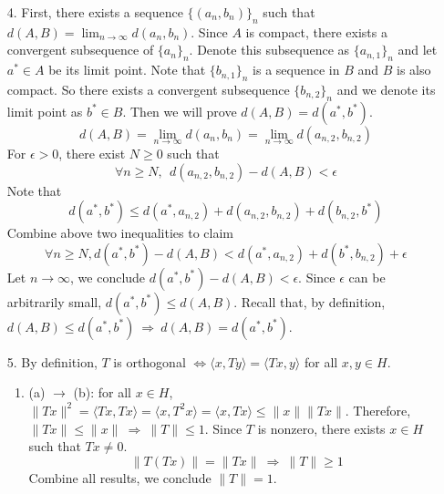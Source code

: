 \begin{itemize}
	\item[4.] First, there exists a sequence $\{(a_n, b_n)\}_n$ such that $d(A,B) = \lim_{n\rightarrow\infty}d(a_n,b_n)$. Since $A$ is compact, there exists a convergent subsequence of $\{a_n\}_n$. Denote this subsequence as $\{a_{n,1}\}_n$ and let $a^*\in A$ be its limit point. Note that $\{b_{n,1}\}_n$ is a sequence in $B$ and $B$ is also compact. So there exists a convergent subsequence $\{b_{n,2}\}_n$ and we denote its limit point as $b^*\in B$. Then we will prove $d(A,B) = d(a^*, b^*)$.  
	$$
	d(A,B) = \lim_{n\rightarrow\infty} d(a_n, b_n) = \lim_{n\rightarrow\infty} d\left(a_{n,2}, b_{n,2} \right)
	$$
	For $\epsilon >0$, there exist $N\ge0$ such that
	$$
	\forall n\ge N,~~d(a_{n,2}, b_{n,2}) - d(A,B) < \epsilon
	$$
	Note that
	$$
	d(a^*,b^*)\le d(a^*, a_{n,2}) + d(a_{n,2},b_{n,2}) + d(b_{n,2},b^*)
	$$
	Combine above two inequalities to claim
	$$
	\forall n\ge  N, d(a^*,b^*)-d(A,B) < d(a^*, a_{n,2}) + d(b^*, b_{n,2})  +\epsilon
	$$
	Let $n\rightarrow \infty$, we conclude $ d(a^*,b^*)-d(A,B) <\epsilon$. 
	Since $\epsilon$ can be arbitrarily small, $d(a^*,b^*)\le d(A,B)$. Recall that, by definition, $d(A,B)\le d(a^*,b^*) ~\Rightarrow~ d(A,B)=d(a^*,b^*)$.
	
	\item[5.] 
	 By definition, $T$ is orthogonal $\Leftrightarrow \langle x, Ty\rangle = \langle Tx, y\rangle$ for all $x,y\in H$.
	\begin{enumerate}[$\bullet$]
		\item (a) $\rightarrow$ (b): for all $x\in H$, $\lVert Tx\rVert^2 = \langle Tx, Tx\rangle = \langle x, T^2x\rangle = \langle x, Tx\rangle \le \lVert x\rVert \lVert Tx\rVert$. Therefore, $\lVert Tx\rVert \le \lVert x\rVert ~\Rightarrow~ \lVert T\rVert \le 1$. Since $T$ is nonzero, there exists $x\in H$ such that $Tx\neq 0$. 
		$$
		\lVert T(Tx)\rVert = \lVert Tx\rVert ~\Rightarrow~ \lVert T\rVert \ge 1 
		$$
		Combine all results, we conclude $\lVert T\rVert = 1$.
		

\end{enumerate}
\end{itemize}
